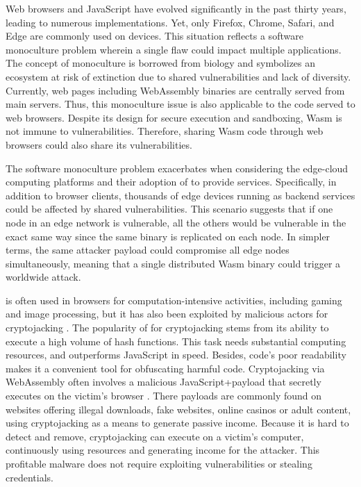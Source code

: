 
Web browsers and JavaScript have evolved significantly in the past thirty years, leading to numerous implementations. 
Yet, only Firefox, Chrome, Safari, and Edge are commonly used on devices.
This situation reflects a software monoculture problem wherein a single flaw could impact multiple applications. 
The concept of monoculture is borrowed from biology and symbolizes an ecosystem at risk of extinction due to shared vulnerabilities and lack of diversity. 
Currently, web pages including WebAssembly binaries are centrally served from main servers. 
Thus, this monoculture issue is also applicable to the \Wasm code served to web browsers. 
Despite its design for secure execution and sandboxing, Wasm is not immune to vulnerabilities. 
Therefore, sharing Wasm code through web browsers could also share its vulnerabilities. 

The software monoculture problem exacerbates when considering the edge-cloud computing platforms and their adoption of \Wasm to provide services.
Specifically, in addition to browser clients, thousands of edge devices running \Wasm as backend services could be affected by shared vulnerabilities. 
This scenario suggests that if one node in an edge network is vulnerable, all the others would be vulnerable in the exact same way since the same binary is replicated on each node. 
In simpler terms, the same attacker payload could compromise all edge nodes simultaneously, meaning that a single distributed Wasm binary could trigger a worldwide attack.



\Wasm is often used in browsers for computation-intensive activities, including gaming and image processing, but it has also been exploited by malicious actors for cryptojacking \cite{10.1145/3339252.3339261}.
The popularity of \Wasm for cryptojacking stems from its ability to execute a high volume of hash functions. 
This task needs substantial computing resources, and \Wasm outperforms JavaScript in speed.
Besides, \Wasm code's poor readability makes it a convenient tool for obfuscating harmful code.
Cryptojacking via WebAssembly often involves a malicious JavaScript+\Wasm payload that secretly executes on the victim's browser \cite{9566204}.
There payloads are commonly found on websites offering illegal downloads, fake websites, online casinos or adult content, using cryptojacking as a means to generate passive income.
Because it is hard to detect and remove, cryptojacking can execute on a victim's computer, continuously using resources and generating income for the attacker.
This profitable malware does not require exploiting vulnerabilities or stealing credentials.



